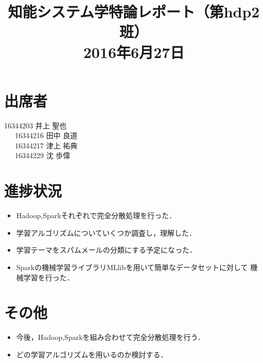 \documentclass[a4paper,12pt]{jarticle}
\begin{document}
%
\title{\vspace{-30mm}知能システム学特論レポート（第hdp2班）\\ 2016年6月27日}
\date{}
%
%
\maketitle
%
\vspace{-30mm}
%
\section{出席者}
16344203 井上 聖也\\
~~~16344216 田中 良道\\
~~~16344217 津上 祐典\\
~~~16344229 沈 歩偉
\section{進捗状況}
\begin{itemize}
 \item Hadoop,Sparkそれぞれで完全分散処理を行った．
 \item 学習アルゴリズムについていくつか調査し，理解した．
 \item 学習テーマをスパムメールの分類にする予定になった．
 \item Sparkの機械学習ライブラリMLlibを用いて簡単なデータセットに対して
	   機械学習を行った．
\end{itemize}

\section{その他}
\begin{itemize}
 \item 今後，Hadoop,Sparkを組み合わせて完全分散処理を行う．
 \item どの学習アルゴリズムを用いるのか検討する．
\end{itemize}
\end{document}
